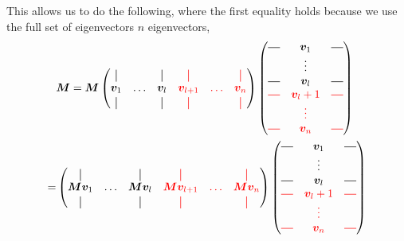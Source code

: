 This allows us to do the following, where the first equality holds because we use the full set of eigenvectors $n$ eigenvectors,
\begin{align}
    &\bm{M} = \bm{M}
    \begin{pmatrix}
    \vertbar &        & \vertbar & \red{\vertbar    } & \red{        }& \red{ \vertbar }\\
    \bm{v}_1 & \hdots & \bm{v}_l & \red{\bm{v}_{l+1}} & \red{ \hdots }& \red{ \bm{v}_n }\\
    \vertbar &        & \vertbar & \red{\vertbar    } & \red{        }& \red{ \vertbar }
    \end{pmatrix}
    \begin{pmatrix}
        \horzbar & \bm{v}_1   & \horzbar \\
                 & \vdots     &          \\
        \horzbar & \bm{v}_l   & \horzbar \\
        \red{\horzbar} & \red{\bm{v}_l+1} & \red{\horzbar} \\
                       & \red{\vdots    } &                \\
        \red{\horzbar} & \red{\bm{v}_n  } & \red{\horzbar} \\
    \end{pmatrix} \\
    =&
    \begin{pmatrix}
    \vertbar       &        & \vertbar       & \red{\vertbar    }       & \red{        }& \red{ \vertbar }       \\
    \bm{M}\bm{v}_1 & \hdots & \bm{M}\bm{v}_l & \red{\bm{M}\bm{v}_{l+1}} & \red{ \hdots }& \red{\bm{M} \bm{v}_n } \\
    \vertbar       &        & \vertbar       & \red{\vertbar    }       & \red{        }& \red{ \vertbar }
    \end{pmatrix}
    \begin{pmatrix}
        \horzbar & \bm{v}_1   & \horzbar \\
                 & \vdots     &          \\
        \horzbar & \bm{v}_l   & \horzbar \\
        \red{\horzbar} & \red{\bm{v}_l+1} & \red{\horzbar} \\
                       & \red{\vdots    } &                \\
        \red{\horzbar} & \red{\bm{v}_n  } & \red{\horzbar} \\
    \end{pmatrix} \\

\end{align}
